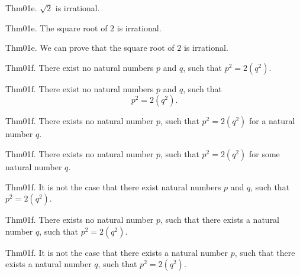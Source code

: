 \documentclass{article}
\begin{document}
Thm01e. $\sqrt{ 2}$ is irrational.

Thm01e. The square root of $2$ is irrational.

Thm01e. We can prove that the square root of $2$ is irrational.

Thm01f. There exist no natural numbers $p$ and $q$, such that $p ^{ 2}= 2 (q ^{ 2})$.

Thm01f. There exist no natural numbers $p$ and $q$, such that $$p ^{ 2}= 2 (q ^{ 2}).$$

Thm01f. There exists no natural number $p$, such that $p ^{ 2}= 2 (q ^{ 2})$ for a natural number $q$.

Thm01f. There exists no natural number $p$, such that $p ^{ 2}= 2 (q ^{ 2})$ for some natural number $q$.

Thm01f. It is not the case that there exist natural numbers $p$ and $q$, such that $p ^{ 2}= 2 (q ^{ 2})$.

Thm01f. There exists no natural number $p$, such that there exists a natural number $q$, such that $p ^{ 2}= 2 (q ^{ 2})$.

Thm01f. It is not the case that there exists a natural number $p$, such that there exists a natural number $q$, such that $p ^{ 2}= 2 (q ^{ 2})$.
\end{document}
